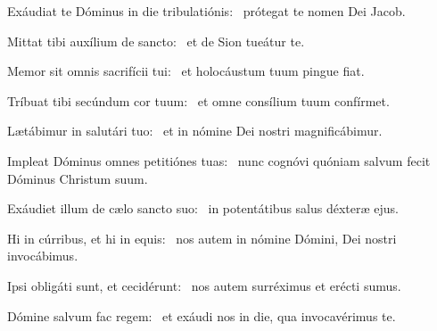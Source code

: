 \item Exáudiat te Dóminus in die tribulatiónis:~\psstar{} prótegat te nomen Dei Jacob.

\item Mittat tibi auxílium de sancto:~\psstar{} et de Sion tueátur te.

\item Memor sit omnis sacrifícii tui:~\psstar{} et holocáustum tuum pingue fiat.

\item Tríbuat tibi secúndum cor tuum:~\psstar{} et omne consílium tuum confírmet.

\item Lætábimur in salutári tuo:~\psstar{} et in nómine Dei nostri magnificábimur.

\item Impleat Dóminus omnes petitiónes tuas:~\psstar{} nunc cognóvi quóniam salvum fecit Dóminus Christum suum.

\item Exáudiet illum de cælo sancto suo:~\psstar{} in potentátibus salus déxteræ ejus.

\item Hi in cúrribus, et hi in equis:~\psstar{} nos autem in nómine Dómini, Dei nostri invocábimus.

\item Ipsi obligáti sunt, et cecidérunt:~\psstar{} nos autem surréximus et erécti sumus.

\item Dómine salvum fac regem:~\psstar{} et exáudi nos in die, qua invocavérimus te.

